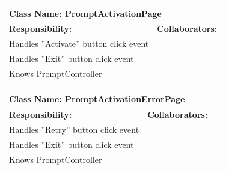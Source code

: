 \documentclass[]{article}
\begin{document}
	\begin{table}[H]
	\centering
	\begin{tabular}{|p{6cm}|p{6cm}|}
	\hline 
		\multicolumn{2}{|l|}{\textbf{Class Name: PromptActivationPage}} \\
	\hline
	\textbf{Responsibility:} & \textbf{Collaborators:} \\
	\hline
	Handles ”Activate” button click event & \\ \hline
	Handles ”Exit” button click event & \\ \hline
	Knows PromptController & \\ \hline
	\end{tabular}
	\end{table}
	
	\begin{table}[H]
	\centering
	\begin{tabular}{|p{6cm}|p{6cm}|}
	\hline 
		\multicolumn{2}{|l|}{\textbf{Class Name: PromptActivationErrorPage}} \\
	\hline
	\textbf{Responsibility:} & \textbf{Collaborators:} \\
	\hline
	Handles ”Retry” button click event & \\ \hline
	Handles ”Exit” button click event & \\ \hline
	Knows PromptController & \\ \hline
	\end{tabular}
	\end{table}
\end{document}
